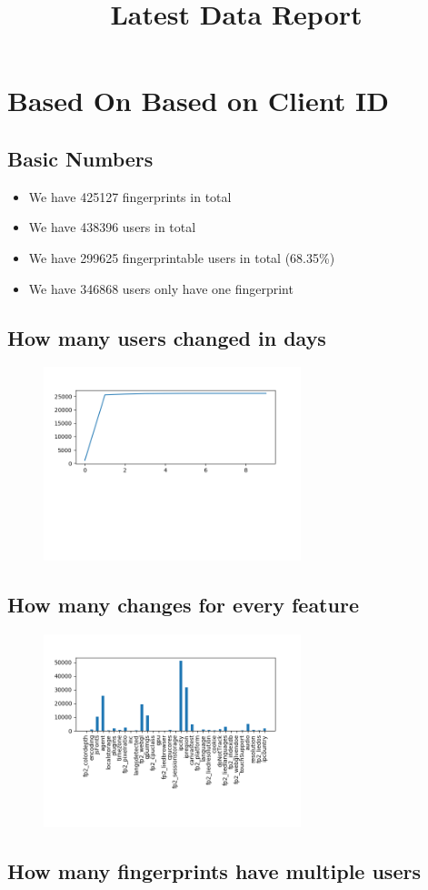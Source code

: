 \documentclass[10pt, conference, compsocconf]{IEEEtran}
\begin{document}
\title{Latest Data Report}
\author{
}
\maketitle
\section{Based On Based on Client ID}
\subsection{Basic Numbers}
\begin{itemize}\item We have 425127 fingerprints in total\item We have 438396 users in total\item We have 299625 fingerprintable users in total (68.35\%)\item We have 346868 users only have one fingerprint \end{itemize}\subsection{How many users changed in days}
\begin{figure}[H]\centering\includegraphics[width=75mm,scale=0.5]{BasedonClientIDchangebytime}\end{figure}\subsection{How many changes for every feature}
\begin{figure}[H]\centering\includegraphics[width=75mm,scale=0.5]{BasedonClientIDfeaturechange}\end{figure}\subsection{How many fingerprints have multiple users}
\end{document}

